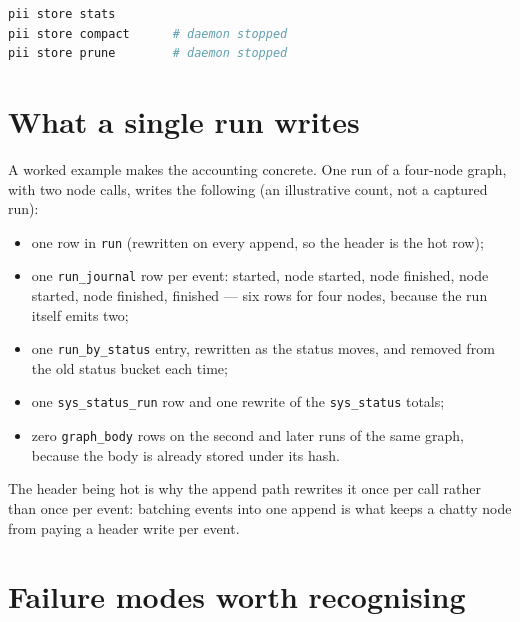 \begin{lstlisting}[language=bash]
pii store stats
pii store compact      # daemon stopped
pii store prune        # daemon stopped
\end{lstlisting}

\section{What a single run writes}

A worked example makes the accounting concrete. One run of a four-node graph, with two node
calls, writes the following (an illustrative count, not a captured run):

\begin{itemize}
	\item one row in \texttt{run} (rewritten on every append, so the header is the hot row);
	\item one \texttt{run\_journal} row per event: started, node started, node finished, node
	started, node finished, finished --- six rows for four nodes, because the run itself emits
	two;
	\item one \texttt{run\_by\_status} entry, rewritten as the status moves, and removed from
	the old status bucket each time;
	\item one \texttt{sys\_status\_run} row and one rewrite of the \texttt{sys\_status} totals;
	\item zero \texttt{graph\_body} rows on the second and later runs of the same graph,
	because the body is already stored under its hash.
\end{itemize}

The header being hot is why the append path rewrites it once per call rather than once per
event: batching events into one append is what keeps a chatty node from paying a header write
per event.

\section{Failure modes worth recognising}

